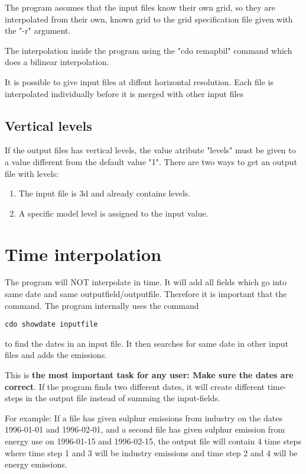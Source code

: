 \documentclass[12pt]{article}
\begin{document}
The program assumes that the input files know their own grid, so they are interpolated from their own, known grid to the grid specification file
given with the "-r" argument.

The interpolation inside the program using the "cdo remapbil" command which does a bilinear interpolation.

It is possible to give input files at diffent horizontal resolution. Each file is interpolated individually before it is merged with other input files

\subsection{Vertical levels}

If the output files has vertical levels, the value atribute "levels" must be given to a value different from the default value "1".
There are two ways to get an output file with levels:
\begin{enumerate}
\item The input file is 3d and already contains levels.
\item A specific model level is assigned to the input value.
\end{enumerate}

\section{Time interpolation}

The program will NOT interpolate in time. It will add all fields which go into same date and same outputfield/outputfile.
Therefore it is important that the command. The program internally uses the command 
\begin{verbatim}
cdo showdate inputfile
\end{verbatim}
to find the dates in an input file. It then searches for same date in other input files and adds the emissions.

This is {\bf the most important task for any user: Make sure the dates are correct}. If the program finds two different
dates, it will create different time-steps in the output file instead of summing the input-fields.

For example: If a file has given sulphur emissions from industry on the dates 1996-01-01 and 1996-02-01, and a second file
has given sulphur emission from energy use on 1996-01-15 and 1996-02-15, the output file will contain 4 time steps where 
time step 1 and 3 will be industry emissions and time step 2 and 4 will be energy emissions.
\end{document}
